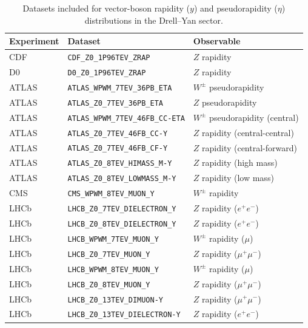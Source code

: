 \documentclass[11pt,a4paper]{article}
\begin{document}
\begin{table}[htbp]
\centering
\small
\begin{tabular}{lll}
\toprule
Experiment & Dataset & Observable \\
\midrule
CDF & \texttt{CDF\_Z0\_1P96TEV\_ZRAP} & $Z$ rapidity \\
D0  & \texttt{D0\_Z0\_1P96TEV\_ZRAP} & $Z$ rapidity \\
ATLAS & \texttt{ATLAS\_WPWM\_7TEV\_36PB\_ETA} & $W^\pm$ pseudorapidity \\
ATLAS & \texttt{ATLAS\_Z0\_7TEV\_36PB\_ETA} & $Z$ pseudorapidity \\
ATLAS & \texttt{ATLAS\_WPWM\_7TEV\_46FB\_CC-ETA} & $W^\pm$ pseudorapidity (central) \\
ATLAS & \texttt{ATLAS\_Z0\_7TEV\_46FB\_CC-Y} & $Z$ rapidity (central-central) \\
ATLAS & \texttt{ATLAS\_Z0\_7TEV\_46FB\_CF-Y} & $Z$ rapidity (central-forward) \\
ATLAS & \texttt{ATLAS\_Z0\_8TEV\_HIMASS\_M-Y} & $Z$ rapidity (high mass) \\
ATLAS & \texttt{ATLAS\_Z0\_8TEV\_LOWMASS\_M-Y} & $Z$ rapidity (low mass) \\
CMS & \texttt{CMS\_WPWM\_8TEV\_MUON\_Y} & $W^\pm$ rapidity \\
LHCb & \texttt{LHCB\_Z0\_7TEV\_DIELECTRON\_Y} & $Z$ rapidity ($e^+e^-$) \\
LHCb & \texttt{LHCB\_Z0\_8TEV\_DIELECTRON\_Y} & $Z$ rapidity ($e^+e^-$) \\
LHCb & \texttt{LHCB\_WPWM\_7TEV\_MUON\_Y} & $W^\pm$ rapidity ($\mu$) \\
LHCb & \texttt{LHCB\_Z0\_7TEV\_MUON\_Y} & $Z$ rapidity ($\mu^+\mu^-$) \\
LHCb & \texttt{LHCB\_WPWM\_8TEV\_MUON\_Y} & $W^\pm$ rapidity ($\mu$) \\
LHCb & \texttt{LHCB\_Z0\_8TEV\_MUON\_Y} & $Z$ rapidity ($\mu^+\mu^-$) \\
LHCb & \texttt{LHCB\_Z0\_13TEV\_DIMUON-Y} & $Z$ rapidity ($\mu^+\mu^-$) \\
LHCb & \texttt{LHCB\_Z0\_13TEV\_DIELECTRON-Y} & $Z$ rapidity ($e^+e^-$) \\
\bottomrule
\end{tabular}
\caption{Datasets included for vector-boson rapidity ($y$) and pseudorapidity ($\eta$) distributions in the Drell--Yan sector.}
\label{tab:DY_rapidity}
\end{table}
\end{document}
